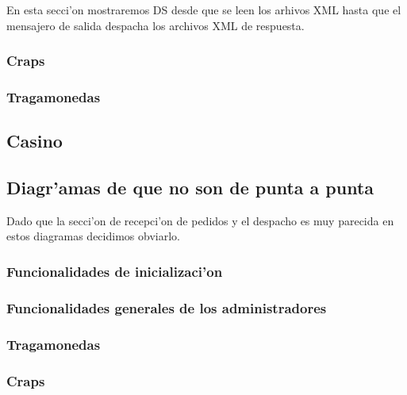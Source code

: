 En esta secci'on mostraremos DS desde que se leen los arhivos XML hasta que el mensajero de salida despacha los archivos XML de respuesta.

\subsubsection{Craps}


\subsubsection{Tragamonedas}


\subsection{Casino}


\subsection{Diagr'amas de que no son de punta a punta}
Dado que la secci'on de recepci'on de pedidos y el despacho es muy parecida en estos diagramas decidimos obviarlo.

\subsubsection{Funcionalidades de inicializaci'on}


\subsubsection{Funcionalidades generales de los administradores}


\subsubsection{Tragamonedas}



\subsubsection{Craps}



